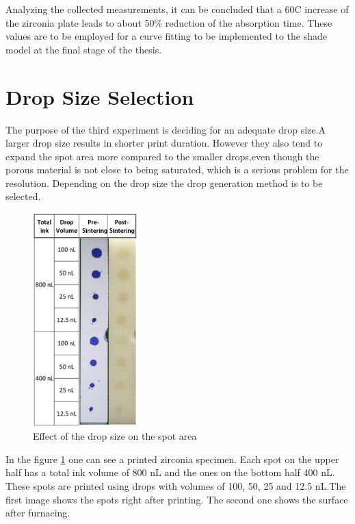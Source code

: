\bigskip

Analyzing the collected measurements, it can be concluded that a 60\textdegree C increase of the zirconia plate leads to about 50\% reduction of the absorption time. These values are to be employed for a curve fitting to be implemented to the shade model at the final stage of the thesis.
 
\section{Drop Size Selection}
The purpose of the third experiment is deciding for an adequate drop size.A larger drop size results in shorter print duration. However they also tend to expand the spot area more compared to the smaller drops,even though the porous material is not close to being saturated, which is a serious problem for the resolution. Depending on the drop size the drop generation method is to be selected. 
\bigskip
\begin{figure}[H]
	\centering
	\includegraphics[width=0.36\textwidth]{grafiken/DropSize.jpg}
	\caption{Effect of the drop size on the spot area}
	\label{fig:DropSize}
\end{figure} 
\bigskip
In the figure \ref{fig:DropSize} one can see a printed zirconia specimen. Each spot on the upper half has a total ink volume of 800 nL and the ones on the bottom half 400 nL. These spots are printed using drops with volumes of 100, 50, 25 and 12.5 nL.The first image shows the spots right after printing. The second one shows the surface after furnacing.

\bigskip

